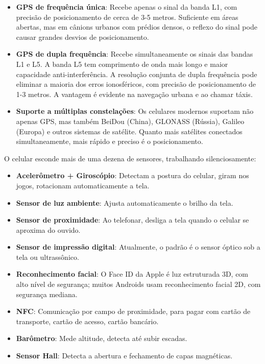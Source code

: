 \begin{itemize}
  \item \textbf{GPS de frequência única}: Recebe apenas o sinal da banda L1, com precisão de posicionamento de cerca de 3-5 metros. Suficiente em áreas abertas, mas em cânions urbanos com prédios densos, o reflexo do sinal pode causar grandes desvios de posicionamento.
  \item \textbf{GPS de dupla frequência}: Recebe simultaneamente os sinais das bandas L1 e L5. A banda L5 tem comprimento de onda mais longo e maior capacidade anti-interferência. A resolução conjunta de dupla frequência pode eliminar a maioria dos erros ionosféricos, com precisão de posicionamento de 1-3 metros. A vantagem é evidente na navegação urbana e ao chamar táxis.
  \item \textbf{Suporte a múltiplas constelações}: Os celulares modernos suportam não apenas GPS, mas também BeiDou (China), GLONASS (Rússia), Galileo (Europa) e outros sistemas de satélite. Quanto mais satélites conectados simultaneamente, mais rápido e preciso é o posicionamento.
\end{itemize}


O celular esconde mais de uma dezena de sensores, trabalhando silenciosamente:

\begin{itemize}
  \item \textbf{Acelerômetro + Giroscópio}: Detectam a postura do celular, giram nos jogos, rotacionam automaticamente a tela.
  \item \textbf{Sensor de luz ambiente}: Ajusta automaticamente o brilho da tela.
  \item \textbf{Sensor de proximidade}: Ao telefonar, desliga a tela quando o celular se aproxima do ouvido.
  \item \textbf{Sensor de impressão digital}: Atualmente, o padrão é o sensor óptico sob a tela ou ultrassônico.
  \item \textbf{Reconhecimento facial}: O Face ID da Apple é luz estruturada 3D, com alto nível de segurança; muitos Androids usam reconhecimento facial 2D, com segurança mediana.
  \item \textbf{NFC}: Comunicação por campo de proximidade, para pagar com cartão de transporte, cartão de acesso, cartão bancário.
  \item \textbf{Barômetro}: Mede altitude, detecta até subir escadas.
  \item \textbf{Sensor Hall}: Detecta a abertura e fechamento de capas magnéticas.
\end{itemize}

